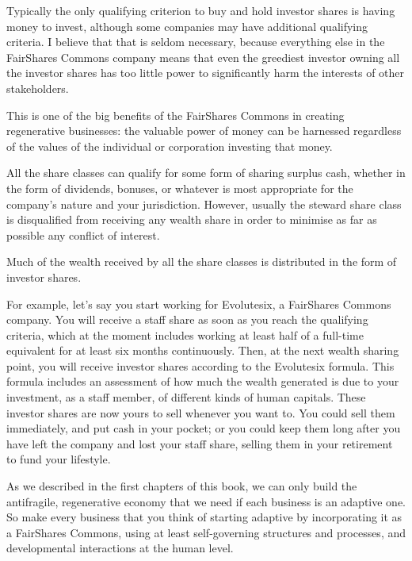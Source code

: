 \begin{description}
Typically the only qualifying criterion to buy and hold investor shares is having money to invest, although some companies may have additional qualifying criteria. I believe that that is seldom necessary, because everything else in the FairShares Commons company means that even the greediest investor owning all the investor shares has too little power to significantly harm the interests of other stakeholders.


This is one of the big benefits of the FairShares Commons in creating regenerative businesses: the valuable power of money can be harnessed regardless of the values of the individual or corporation investing that money.


\end{description}


All the share classes can qualify for some form of sharing surplus cash, whether in the form of dividends, bonuses, or whatever is most appropriate for the company's nature and your jurisdiction. However, usually the steward share class is disqualified from receiving any wealth share in order to minimise as far as possible any conflict of interest.


Much of the wealth received by all the share classes is distributed in the form of investor shares. 


For example, let's say you start working for Evolutesix, a FairShares Commons company. You will receive a staff share as soon as you reach the qualifying criteria, which at the moment includes working at least half of a full-time equivalent for at least six months continuously. Then, at the next wealth sharing point, you will receive investor shares according to the Evolutesix formula. This formula includes an assessment of how much the wealth generated is due to your investment, as a staff member, of different kinds of human capitals. These investor shares are now yours to sell whenever you want to. You could sell them immediately, and put cash in your pocket; or you could keep them long after you have left the company and lost your staff share, selling them in your retirement to fund your lifestyle.


As we described in the first chapters of this book, we can only build the antifragile, regenerative economy that we need if each business is an adaptive one. So make every business that you think of starting adaptive by incorporating it as a FairShares Commons, using at least self-governing structures and processes, and developmental interactions at the human level.


